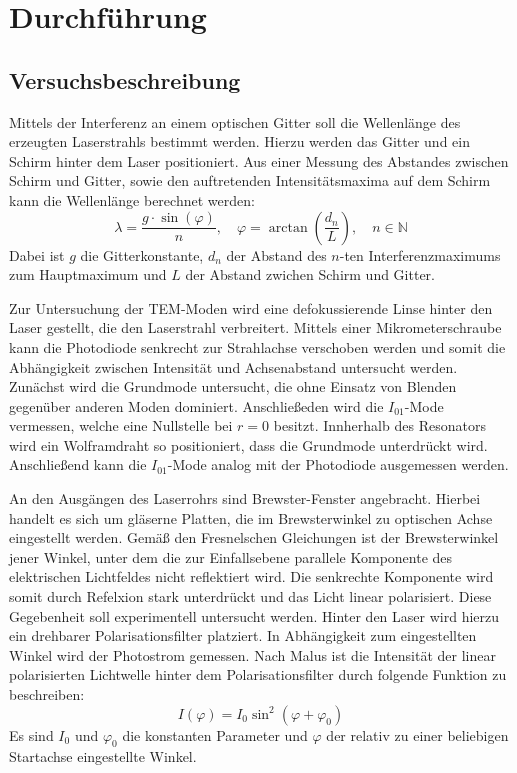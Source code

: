 \section{Durchführung}
\label{sec:Durchführung}



\subsection{Versuchsbeschreibung}
\label{sec:Versuchsbeschreibung}
Mittels der Interferenz an einem optischen Gitter soll die Wellenlänge des erzeugten Laserstrahls bestimmt werden. Hierzu werden das Gitter
und ein Schirm hinter dem Laser positioniert. Aus einer Messung des Abstandes zwischen Schirm und Gitter, sowie den auftretenden Intensitätsmaxima
auf dem Schirm kann die Wellenlänge berechnet werden:
\begin{equation}
	  \lambda = \frac{g \cdot \sin(\varphi)}{n}, \quad \varphi = \arctan\left(\frac{d_n}{L} \right) ,\quad n \in \mathbb{N}
	    \label{eq:interferenz}
\end{equation}
Dabei ist $g$ die Gitterkonstante, $d_n$ der Abstand des $n$-ten Interferenzmaximums zum Hauptmaximum und $L$ der Abstand zwichen Schirm und Gitter.

Zur Untersuchung der TEM-Moden wird eine defokussierende Linse hinter den Laser gestellt, die den Laserstrahl verbreitert.
Mittels einer Mikrometerschraube kann die Photodiode
senkrecht zur Strahlachse verschoben werden und somit die Abhängigkeit zwischen Intensität und Achsenabstand untersucht werden. Zunächst
wird die Grundmode untersucht, die ohne Einsatz von Blenden gegenüber anderen Moden dominiert. Anschließeden wird die $I_{01}$-Mode
vermessen, welche eine Nullstelle bei $r = 0$ besitzt. Innherhalb des Resonators wird ein Wolframdraht so positioniert, dass die Grundmode
unterdrückt wird. Anschließend kann die $I_{01}$-Mode analog mit der Photodiode ausgemessen werden.

An den Ausgängen des Laserrohrs sind Brewster-Fenster angebracht. Hierbei handelt es sich um gläserne Platten, die
im Brewsterwinkel zu optischen Achse eingestellt werden. Gemäß den Fresnelschen Gleichungen ist der Brewsterwinkel jener Winkel, unter dem
die zur Einfallsebene parallele Komponente des elektrischen Lichtfeldes nicht reflektiert wird. Die senkrechte Komponente wird somit
durch Refelxion stark unterdrückt und das Licht linear polarisiert. Diese Gegebenheit soll
experimentell untersucht werden. Hinter den Laser wird hierzu ein drehbarer Polarisationsfilter platziert. In Abhängigkeit zum eingestellten Winkel
wird der Photostrom gemessen. Nach Malus ist die Intensität der linear polarisierten Lichtwelle hinter dem Polarisationsfilter
durch folgende Funktion zu beschreiben:
\begin{equation}
	  I(\varphi) = I_{0} \sin^2\left(\varphi + \varphi_0\right)
	    \label{eq:malus}
\end{equation}
Es sind $I_{0}$ und $\varphi_0$ die konstanten Parameter und $\varphi$ der relativ zu einer beliebigen Startachse eingestellte Winkel.

